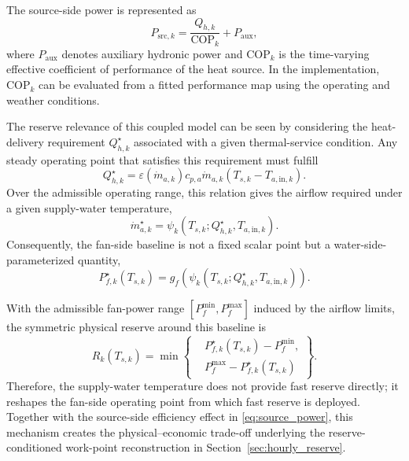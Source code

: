 \documentclass[journal]{IEEEtran}
\theoremstyle{remark}
\begin{document}
The source-side power is represented as
\begin{equation}
	P_{\mathrm{src},k}
	=
	\frac{Q_{h,k}}{\mathrm{COP}_k}
	+
	P_{\mathrm{aux}},
	\label{eq:source_power}
\end{equation}
where \(P_{\mathrm{aux}}\) denotes auxiliary hydronic power and \(\mathrm{COP}_k\) is the time-varying effective coefficient of performance of the heat source. In the implementation, \(\mathrm{COP}_k\) can be evaluated from a fitted performance map using the operating and weather conditions. 

The reserve relevance of this coupled model can be seen by considering the heat-delivery requirement \(Q_{h,k}^{\star}\) associated with a given thermal-service condition. Any steady operating point that satisfies this requirement must fulfill
\begin{equation}
	Q_{h,k}^{\star}
	=
	\varepsilon(\dot m_{a,k})
	c_{p,a}\dot m_{a,k}
	\left(T_{s,k}-T_{a,\mathrm{in},k}\right).
	\label{eq:equal_heat_requirement}
\end{equation}
Over the admissible operating range, this relation gives the airflow required under a given supply-water temperature,
\begin{equation}
	\dot m_{a,k}^{\star}
	=
	\psi_k
	\left(
	T_{s,k};
	Q_{h,k}^{\star},T_{a,\mathrm{in},k}
	\right).
	\label{eq:airflow_family}
\end{equation}
Consequently, the fan-side baseline is not a fixed scalar point but a water-side-parameterized quantity,
\begin{equation}
	P_{f,k}^{\star}(T_{s,k})
=
g_f
\left(
\psi_k
\left(
T_{s,k};Q_{h,k}^{\star},T_{a,\mathrm{in},k}
\right)
\right).
	\label{eq:fan_baseline_family}
\end{equation}

With the admissible fan-power range \([P_f^{\min},P_f^{\max}]\) induced by the airflow limits, the symmetric physical reserve around this baseline is
\begin{equation}
	R_{k}(T_{s,k})
	=
	\min
	\left\{
	\begin{aligned}
		& P_{f,k}^{\star}(T_{s,k})-P_f^{\min},\\
		& P_f^{\max}-P_{f,k}^{\star}(T_{s,k})
	\end{aligned}
	\right\}.
	\label{eq:physical_reserve}
\end{equation}
Therefore, the supply-water temperature does not provide fast reserve directly; it reshapes the fan-side operating point from which fast reserve is deployed. Together with the source-side efficiency effect in \eqref{eq:source_power}, this mechanism creates the physical--economic trade-off underlying the reserve-conditioned work-point reconstruction in Section~\ref{sec:hourly_reserve}.
\end{document}

